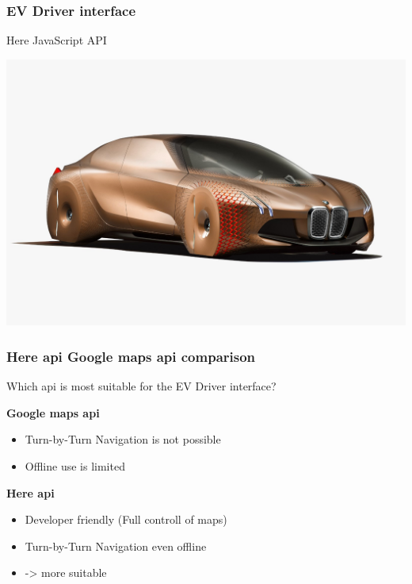 \begin{frame}
	\frametitle{EV Driver interface}
	
	Here JavaScript API \\
	
	\vspace*{-3mm}
	\begin{minipage}[t][0cm]{\paperwidth}%
		\hspace*{-\PraesentationSeitenrand}%
		\includegraphics[width=\paperwidth]{images/bmw1.png}
	\end{minipage}
	
\end{frame}
\clearpage

\begin{frame}
	\frametitle{Here api Google maps api comparison}
	
	Which api is most suitable for the EV Driver interface?
	
	\vspace{-8mm}
	\begin{PraesentationAufzaehlung}
		
		\item \textbf{Google maps api}
		\begin{itemize}
			\item Turn-by-Turn Navigation is not possible
			\item Offline use is limited
		\end{itemize}
		
		\item \textbf{Here api}
		\begin{itemize}
			\item Developer friendly (Full controll of maps)
			\item Turn-by-Turn Navigation even offline
			\item -> more suitable
		\end{itemize}
		
	\end{PraesentationAufzaehlung}
	\vspace{-2mm}
	
\end{frame}
\clearpage

